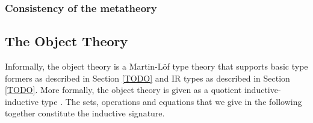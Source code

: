 \documentclass[acmsmall,screen,review,anonymous]{acmart}
\begin{document}
\subsubsection{Consistency of the metatheory}


\subsection{The Object Theory}\label{sec:object-theory}

Informally, the object theory is a Martin-Löf type theory that supports basic type formers as
described in Section \ref{TODO} and IR types as described in Section \ref{TODO}. More formally, the
object theory is given as a quotient inductive-inductive type \cite{TODO}. The sets, operations and
equations that we give in the following together constitute the inductive signature.
\end{document}
